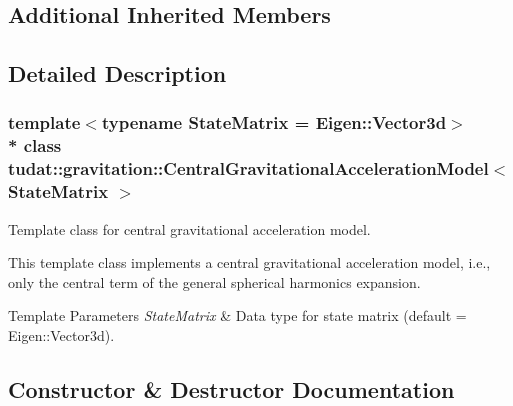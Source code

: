\subsection*{Additional Inherited Members}


\subsection{Detailed Description}
\subsubsection*{template$<$typename State\+Matrix = Eigen\+::\+Vector3d$>$\\*
class tudat\+::gravitation\+::\+Central\+Gravitational\+Acceleration\+Model$<$ State\+Matrix $>$}

Template class for central gravitational acceleration model. 

This template class implements a central gravitational acceleration model, i.\+e., only the central term of the general spherical harmonics expansion. 
\begin{DoxyTemplParams}{Template Parameters}
{\em State\+Matrix} & Data type for state matrix (default = Eigen\+::\+Vector3d). \\
\hline
\end{DoxyTemplParams}


\subsection{Constructor \& Destructor Documentation}
